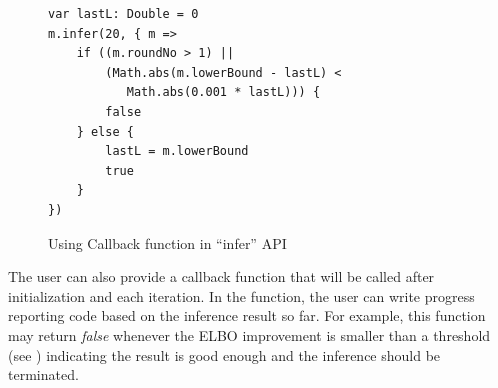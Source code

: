 \begin{figure}[h]
\centering
\begin{lstlisting}
var lastL: Double = 0
m.infer(20, { m =>
	if ((m.roundNo > 1) || 
		(Math.abs(m.lowerBound - lastL) < 
		   Math.abs(0.001 * lastL))) {
		false
	} else {
		lastL = m.lowerBound
		true	
	}
})
\end{lstlisting}
\caption{Using Callback function in ``infer'' API}
\label{fig:two_coins_callback}
\end{figure}

The user can also provide a callback function that will be called after
initialization and each iteration. In the function, the user can write
progress reporting code based on the inference result so far. 
For example, this function may return {\em false} whenever
the ELBO improvement is smaller than a threshold 
(see ) indicating the result is good enough 
and the inference should be terminated. 


